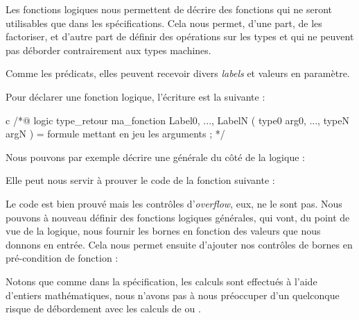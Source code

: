 Les fonctions logiques nous permettent de décrire des fonctions qui ne seront 
utilisables que dans les spécifications. Cela nous permet, d'une part, de les 
factoriser, et d'autre part de définir des opérations sur les types  et 
 qui ne peuvent pas déborder contrairement aux types machines.



Comme les prédicats, elles peuvent recevoir divers \textit{labels} et valeurs en 
paramètre.





Pour déclarer une fonction logique, l'écriture est la suivante :



\begin{CodeBlock}{c}
/*@
  logic type_retour ma_fonction{ Label0, ..., LabelN }( type0 arg0, ..., typeN argN ) =
    formule mettant en jeu les arguments ;
*/
\end{CodeBlock}



Nous pouvons par exemple décrire une  générale du côté de la logique :






Elle peut nous servir à prouver le code de la fonction suivante :








Le code est bien prouvé mais les contrôles d'\textit{overflow}, eux, ne le sont pas. Nous 
pouvons à nouveau définir des fonctions logiques générales, qui vont, du point de 
vue de la logique, nous fournir les bornes en fonction des valeurs que nous donnons
en entrée. Cela nous permet ensuite d'ajouter nos contrôles de bornes en 
pré-condition de fonction :






\begin{Information}
Notons que comme dans la spécification, les calculs sont effectués à l'aide 
d'entiers mathématiques, nous n'avons pas à nous préoccuper d'un quelconque
risque de débordement avec les calculs de  ou .
\end{Information}


